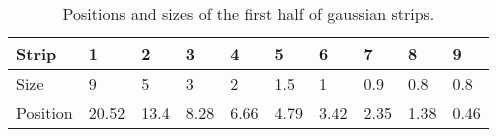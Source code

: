 \begin{table}[!ht]
  \centering
  \caption[Positions and sizes of the first half of gaussian strips]{Positions and sizes of the first half of gaussian strips.}
  \label{chap4:GaussianStrips}
  \begin{tabularx}{\linewidth}{lXXXXXXXXX}
    \toprule
    Strip    & 1     & 2    & 3    & 4    & 5    & 6    & 7    & 8    & 9    \\
    \midrule
    Size     & 9     & 5    & 3    & 2    & 1.5  & 1    & 0.9  & 0.8  & 0.8  \\
    Position & 20.52 & 13.4 & 8.28 & 6.66 & 4.79 & 3.42 & 2.35 & 1.38 & 0.46 \\
    \bottomrule
  \end{tabularx}
\end{table}

